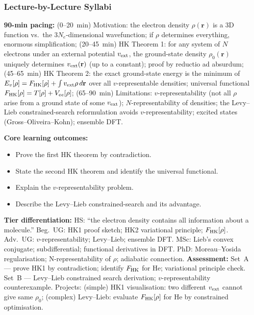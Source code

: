 \documentclass[11pt,a4paper]{article}
\begin{document}
\subsubsection*{Lecture-by-Lecture Syllabi}

\begin{tcolorbox}[chembox, title={Module~III.3 --- Lecture L01: Hohenberg--Kohn Theorems}]
\textbf{90-min pacing:} (0--20~min) Motivation: the electron density $\rho(\mathbf{r})$ is a 3D function vs.\ the $3N_e$-dimensional wavefunction; if $\rho$ determines everything, enormous simplification; (20--45~min) HK Theorem 1: for any system of $N$ electrons under an external potential $v_{\rm ext}$, the ground-state density $\rho_0(\mathbf{r})$ uniquely determines $v_{\rm ext}(\mathbf{r})$ (up to a constant); proof by reductio ad absurdum; (45--65~min) HK Theorem 2: the exact ground-state energy is the minimum of $E_v[\rho]=F_{\rm HK}[\rho]+\int v_{\rm ext}\rho\,d\mathbf{r}$ over all $v$-representable densities; universal functional $F_{\rm HK}[\rho]=T[\rho]+V_{ee}[\rho]$; (65--90~min) Limitations: $v$-representability (not all $\rho$ arise from a ground state of some $v_{\rm ext}$); $N$-representability of densities; the Levy--Lieb constrained-search reformulation avoids $v$-representability; excited states (Gross--Oliveira--Kohn); ensemble DFT.

\medskip\textbf{Core learning outcomes:}
\begin{itemize}[leftmargin=1.4em,topsep=2pt,itemsep=1pt]
  \item Prove the first HK theorem by contradiction.
  \item State the second HK theorem and identify the universal functional.
  \item Explain the $v$-representability problem.
  \item Describe the Levy--Lieb constrained-search and its advantage.
\end{itemize}
\medskip\textbf{Tier differentiation:}
HS: ``the electron density contains all information about a molecule.''
Beg.\ UG: HK1 proof sketch; HK2 variational principle; $F_{\rm HK}[\rho]$.
Adv.\ UG: $v$-representability; Levy--Lieb; ensemble DFT.
MSc: Lieb's convex conjugate; subdifferential; functional derivatives in DFT.
PhD: Moreau--Yosida regularisation; N-representability of $\rho$; adiabatic connection.
\medskip\textbf{Assessment:}
Set~A --- prove HK1 by contradiction; identify $F_{\rm HK}$ for He; variational principle check.
Set~B --- Levy--Lieb constrained search derivation; $v$-representability counterexample.
Projects: (simple) HK1 visualisation: two different $v_{\rm ext}$ cannot give same $\rho_0$; (complex) Levy--Lieb: evaluate $F_{\rm HK}[\rho]$ for He by constrained optimisation.
\end{tcolorbox}
\end{document}
